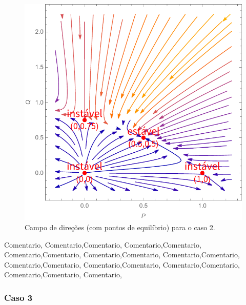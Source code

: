 \bigskip
\begin{figure}[htbp]
\centering
\includegraphics[keepaspectratio=true,scale=0.8]{caso2_c.pdf}
\caption{Campo de direções (com pontos de equilíbrio) para o caso 2.}
\label{fig:yyy}
\end{figure}
\bigskip
\noindent
Comentario, Comentario,Comentario, Comentario,Comentario, Comentario,Comentario, Comentario,Comentario, Comentario,Comentario, Comentario,Comentario, Comentario,Comentario, Comentario,Comentario, Comentario,Comentario, Comentario,




















\pagebreak
\subsubsection{Caso 3}


